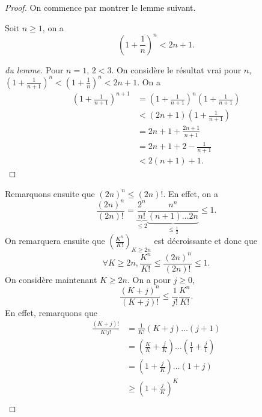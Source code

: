 \documentclass[../main.tex]{subfiles}
\begin{document}
\begin{proof}
    On commence par montrer le lemme suivant.
    \begin{lemma} Soit \(n\ge 1\), on a
        \begin{equation}
            \left(1+\frac{1}{n}\right)^n< 2n+1.
        \end{equation}
    \end{lemma}
    \begin{proof}[du lemme]
        Pour \(n=1\), \(2<3\). On considère le résultat vrai pour \(n\),
        \(\left(1+\frac{1}{n+1}\right)^n < \left(1+\frac{1}{n}\right)^n < 2n+1\).
        On a 
        \begin{align}
            \left(1+\frac{1}{n+1}\right)^{n+1} &= \left(1+\frac{1}{n+1}\right)^n\left(1+\frac{1}{n+1}\right)\\
            &< (2n+1)\left(1+\frac{1}{n+1}\right)\\
            &= 2n+1+\frac{2n+1}{n+1}\\
            &= 2n+1 + 2 - \frac{1}{n+1}\\
            &< 2(n+1) + 1.
        \end{align}
    \end{proof}
    Remarquons ensuite que \((2n)^n\le (2n)!\). En effet, on a 
    \begin{equation}
        \frac{(2n)^n}{(2n)!} = \underbrace{\frac{2^n}{n!}}_{\le 2} \underbrace{\frac{n^n}{(n+1)\ldots 2n}}_{\le \frac{1}{2}} \le 1.
    \end{equation}
    On remarquera ensuite que \(\left(\frac{K^n}{K!}\right)_{K\ge 2n}\) est décroissante et donc que
    \begin{equation}
        \forall K \ge 2n, \frac{K^n}{K!} \le \frac{(2n)^n}{(2n)!} \le 1.
    \end{equation}
    On considère maintenant \(K \ge 2n\). On a pour \(j\ge 0\),
    \begin{equation}
        \frac{(K+j)^n}{(K+j)!}\le \frac{1}{j!}\frac{K^n}{K!}.
    \end{equation}
    En effet, remarquons que 
    \begin{align}
        \frac{(K+j)!}{K!j!} & = \frac{1}{K!}(K+j)\ldots (j+1)\\
        &= \left(\frac{K}{K} + \frac{j}{K}\right)\ldots \left(\frac{1}{1} + \frac{j}{1}\right)\\
        & = \left(1 + \frac{j}{K}\right)\ldots \left(1 + j\right)\\
        & \ge \left(1+\frac{j}{K}\right)^K \\

\end{align}
\end{proof}
\end{document}
